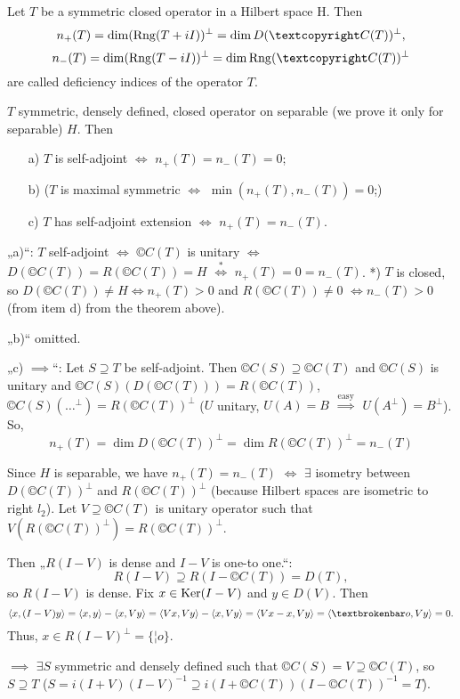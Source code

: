 \documentclass[12pt]{article}					%
\begin{document}
\begin{definice}
	Let $T$ be a symmetric closed operator in a Hilbert space H. Then
	$$ n_+(T) = \dim(\Rang(T + iI))^\perp = \dim D(©C(T))^\perp, $$
	$$ n_-(T) = \dim(\Rang(T - iI))^\perp = \dim \Rang(©C(T))^\perp $$
	are called deficiency indices of the operator $T$.
\end{definice}

\begin{veta}
	$T$ symmetric, densely defined, closed operator on separable (we prove it only for separable) $H$. Then
	\begin{itemize}
		\item[a)] $T$ is self-adjoint $\Leftrightarrow$ $n_+(T) = n_-(T) = 0$;
		\item[b)] ($T$ is maximal symmetric $\Leftrightarrow$ $\min(n_+(T), n_-(T)) = 0$;)
		\item[c)] $T$ has self-adjoint extension $\Leftrightarrow$ $n_+(T) = n_-(T)$.
	\end{itemize}

	\begin{dukazin}
		„a)“: $T$ self-adjoint $\Leftrightarrow$ $©C(T)$ is unitary $\Leftrightarrow$ $D(©C(T)) = R(©C(T)) = H$ $\overset{*}\Leftrightarrow$ $n_+(T) = 0 = n_-(T)$. *) $T$ is closed, so $D(©C(T)) ≠ H \Leftrightarrow n_+(T) > 0$ and $R(©C(T)) ≠ 0$ $\Leftrightarrow n_-(T) > 0$ (from item d) from the theorem above).

		„b)“ omitted.

		„c) $\implies$“: Let $S \supseteq T$ be self-adjoint. Then $©C(S) \supseteq ©C(T)$ and $©C(S)$ is unitary and $©C(S)(D(©C(T))) = R(©C(T))$, $©C(S)(…^\perp) = R(©C(T))^\perp$ ($U$ unitary, $U(A) = B$ $\overset{\text{easy}}\implies$ $U(A^\perp) = B^\perp$). So,
		$$ n_+(T) = \dim D(©C(T))^\perp = \dim R(©C(T))^\perp = n_-(T) $$

		Since $H$ is separable, we have $n_+(T) = n_-(T)$ $\Leftrightarrow$ $\exists$ isometry between $D(©C(T))^\perp$ and $R(©C(T))^\perp$ (because Hilbert spaces are isometric to right $l_2$). Let $V \supseteq ©C(T)$ is unitary operator such that $V(R(©C(T))^\perp) = R(©C(T))^\perp$.

		Then „$R(I - V)$ is dense and $I - V$ is one-to one.“:
		$$ R(I - V) \supseteq R(I - ©C(T)) = D(T), $$
		so $R(I - V)$ is dense. Fix $x \in \operatorname{Ker}(I - V)$ and $y \in D(V)$. Then
		$$ \<x, (I - V)y\> = \<x, y\> - \<x, Vy\> = \<Vx, Vy\> - \<x, Vy\> = \<Vx - x, Vy\> = \<¦o, Vy\> = 0. $$
		Thus, $x \in R(I - V)^\perp = \{¦o\}$.

		$\implies$ $\exists S$ symmetric and densely defined such that $©C(S) = V \supseteq ©C(T)$, so $S \supseteq T$ ($S = i(I + V)(I - V)^{-1} \supseteq i(I + ©C(T))(I - ©C(T))^{-1} = T$).
	\end{dukazin}
\end{veta}
\end{document}
